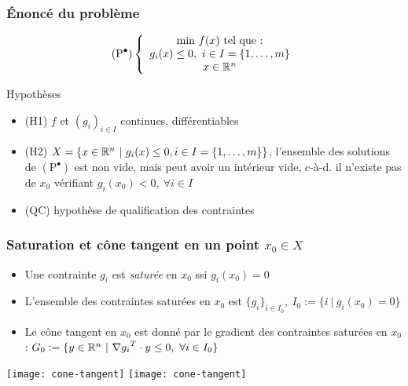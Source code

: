 \documentclass{beamer}
\newcommand{\R}{{\ensuremath\mathbb{R}}}
\begin{document}
\begin{frame}
  \frametitle{\'Enoncé du problème}

  \[
  (\text{P}^\bullet) \left\{
  \begin{array}{c}
    \text{min} \ f(x) \ \text{tel que :} \\
    g_i(x) \leq 0, \ i \in I = \{1, \dots, m\} \\
    x \in \R^n
  \end{array}
  \right.
  \]

  \begin{block}{Hypothèses}
    \begin{itemize}
    \item (H1) $f$ et $(g_i)_{i \in I}$ continues, différentiables
    \item (H2) $X = \{ x \in \R^n \ | \ g_i(x) \leq 0, i \in I = \{1, \dots, m\} \}$,
      l'ensemble des solutions de $(\text{P}^\bullet)$ est non vide, mais peut avoir un
      intérieur vide, c-à-d. il n'existe pas de $x_0$ vérifiant $g_i(x_0) < 0, \ \forall i \in I$
    \item (QC) \alert{hypothèse de qualification des contraintes}
    \end{itemize}
  \end{block}
  
\end{frame}

\begin{frame}
  \frametitle{Saturation et cône tangent en un point $x_0 \in X$}

  \begin{itemize}
    \item Une contrainte $g_i$ est \emph{saturée} en $x_0$ ssi $g_i(x_0) = 0$
    \item L'ensemble des contraintes saturées en $x_0$ est
      $\{g_i\}_{i \in I_0}, \ I_0 := \{i \ | \ g_i(x_0) = 0 \}$
    \item Le cône tangent en $x_0$ est donné par le gradient des contraintes saturées en $x_0$ :
      $G_0 := \{ y \in \R^n \ | \ {\nabla g_i}^T \cdot y \leq 0, \ \forall i \in I_0 \}$ 
  \end{itemize}

  \begin{center}
      \texttt{[image: cone-tangent]} \hspace{0.01\textwidth}   
      \texttt{[image: cone-tangent]}    
  \end{center}
  
\end{frame}
\end{document}
